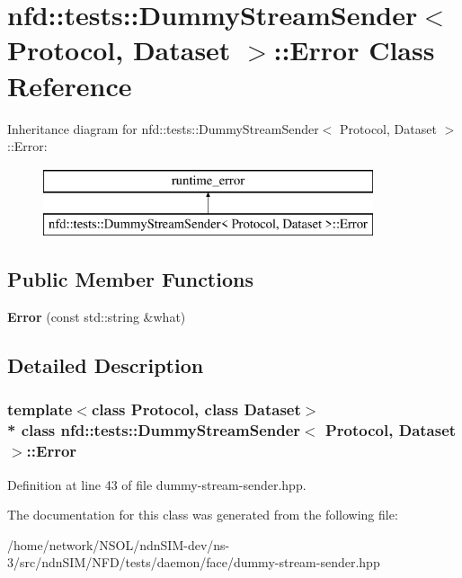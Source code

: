 \hypertarget{classnfd_1_1tests_1_1DummyStreamSender_1_1Error}{}\section{nfd\+:\+:tests\+:\+:Dummy\+Stream\+Sender$<$ Protocol, Dataset $>$\+:\+:Error Class Reference}
\label{classnfd_1_1tests_1_1DummyStreamSender_1_1Error}
Inheritance diagram for nfd\+:\+:tests\+:\+:Dummy\+Stream\+Sender$<$ Protocol, Dataset $>$\+:\+:Error\+:\begin{figure}[H]
\begin{center}
\leavevmode
\includegraphics[height=2.000000cm]{classnfd_1_1tests_1_1DummyStreamSender_1_1Error}
\end{center}
\end{figure}
\subsection*{Public Member Functions}
\begin{DoxyCompactItemize}
\item 
{\bfseries Error} (const std\+::string \&what)\hypertarget{classnfd_1_1tests_1_1DummyStreamSender_1_1Error_aff0272a956ddc2377ce83eb79097f8f8}{}\label{classnfd_1_1tests_1_1DummyStreamSender_1_1Error_aff0272a956ddc2377ce83eb79097f8f8}

\end{DoxyCompactItemize}


\subsection{Detailed Description}
\subsubsection*{template$<$class Protocol, class Dataset$>$\\*
class nfd\+::tests\+::\+Dummy\+Stream\+Sender$<$ Protocol, Dataset $>$\+::\+Error}



Definition at line 43 of file dummy-\/stream-\/sender.\+hpp.



The documentation for this class was generated from the following file\+:\begin{DoxyCompactItemize}
\item 
/home/network/\+N\+S\+O\+L/ndn\+S\+I\+M-\/dev/ns-\/3/src/ndn\+S\+I\+M/\+N\+F\+D/tests/daemon/face/dummy-\/stream-\/sender.\+hpp\end{DoxyCompactItemize}
